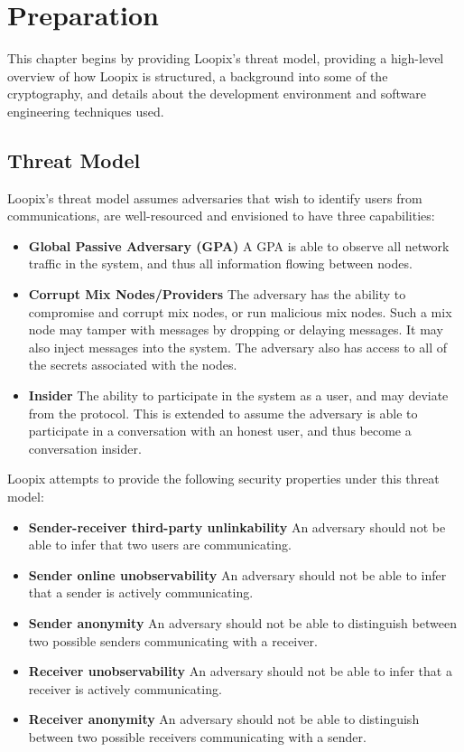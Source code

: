 \documentclass[final,dissertation.tex]{subfiles}
\begin{document}
\chapter{Preparation}

This chapter begins by providing Loopix's threat model, providing a high-level overview of how Loopix is structured, a background into some of the cryptography, and details about the development environment and software engineering techniques used.

\section{Threat Model}

Loopix's threat model \cite{piotrowska2017loopix} assumes adversaries that wish to identify users from communications, are well-resourced and envisioned to have three capabilities:

\begin{itemize}
	\item \textbf{Global Passive Adversary (GPA)} A GPA is able to observe all network traffic in the system, and thus all information flowing between nodes.
	\item \textbf{Corrupt Mix Nodes/Providers} The adversary has the ability to compromise and corrupt mix nodes, or run malicious mix nodes. Such a mix node may tamper with messages by dropping or delaying messages. It may also inject messages into the system. The adversary also has access to all of the secrets associated with the nodes.
	\item \textbf{Insider} The ability to participate in the system as a user, and may deviate from the protocol. This is extended to assume the adversary is able to participate in a conversation with an honest user, and thus become a conversation insider.
\end{itemize}

Loopix attempts to provide the following security properties under this threat model:

\begin{itemize}
	\item \textbf{Sender-receiver third-party unlinkability} An adversary should not be able to infer that two users are communicating.
	\item \textbf{Sender online unobservability} An adversary should not be able to infer that a sender is actively communicating.
	\item \textbf{Sender anonymity} An adversary should not be able to distinguish between two possible senders communicating with a receiver.
	\item \textbf{Receiver unobservability} An adversary should not be able to infer that a receiver is actively communicating.
	\item \textbf{Receiver anonymity} An adversary should not be able to distinguish between two possible receivers communicating with a sender.
\end{itemize}
\end{document}

